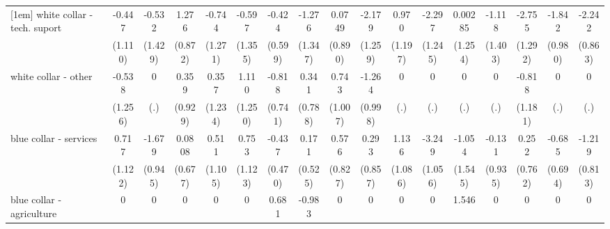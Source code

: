{\begin{tabular}{l*{16}{c}}
[1em]
white collar - tech. suport&      -0.447         &      -0.532         &       1.276         &      -0.744         &      -0.597         &      -0.424         &      -1.276         &      0.0749         &      -2.179         &       0.970         &      -2.297         &     0.00285         &      -1.118         &      -2.755\sym{*}  &      -1.842         &      -2.242\sym{**} \\
                    &     (1.110)         &     (1.429)         &     (0.872)         &     (1.271)         &     (1.355)         &     (0.599)         &     (1.347)         &     (0.890)         &     (1.259)         &     (1.197)         &     (1.245)         &     (1.254)         &     (1.403)         &     (1.292)         &     (0.980)         &     (0.863)         \\
[1em]
white collar - other&      -0.538         &           0         &       0.359         &       0.357         &       1.110         &      -0.818         &       0.341         &       0.743         &      -1.264         &           0         &           0         &           0         &           0         &      -0.818         &           0         &           0         \\
                    &     (1.256)         &         (.)         &     (0.929)         &     (1.234)         &     (1.250)         &     (0.741)         &     (0.788)         &     (1.007)         &     (0.998)         &         (.)         &         (.)         &         (.)         &         (.)         &     (1.181)         &         (.)         &         (.)         \\
[1em]
blue collar - services&       0.717         &      -1.679         &      0.0808         &       0.511         &       0.753         &      -0.437         &       0.171         &       0.576         &       0.293         &       1.136         &      -3.249\sym{**} &      -1.054         &      -0.131         &       0.252         &      -0.685         &      -1.219         \\
                    &     (1.122)         &     (0.945)         &     (0.677)         &     (1.105)         &     (1.123)         &     (0.470)         &     (0.525)         &     (0.827)         &     (0.857)         &     (1.086)         &     (1.056)         &     (1.545)         &     (0.935)         &     (0.762)         &     (0.694)         &     (0.813)         \\
[1em]
blue collar - agriculture&           0         &           0         &           0         &           0         &           0         &       0.681         &      -0.983         &           0         &           0         &           0         &           0         &       1.546         &           0         &           0         &           0         &           0         \\

\end{tabular}}
